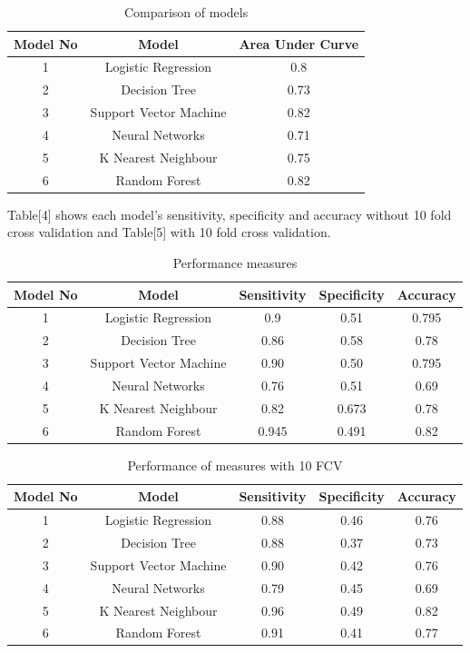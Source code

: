 \documentclass{article}\usepackage[]{graphicx}\usepackage[]{color}
\begin{document}
\begin{table}[t]
\caption{Comparison of models}
\centering
\begin{tabular}{c|c|c}
\toprule
Model No & Model & Area Under Curve \\
\midrule
1 & Logistic Regression & 0.8 \\
2 & Decision Tree & 0.73 \\
3 & Support Vector Machine & 0.82 \\
4 & Neural Networks & 0.71 \\
5 & K Nearest Neighbour & 0.75 \\
6 & Random Forest & 0.82 \\

\bottomrule
\end{tabular}
\label{tab}
\end{table}
Table[4] shows each model's sensitivity, specificity and accuracy without 10 fold cross validation and Table[5] with 10 fold cross validation.
\begin{table}[t]
\caption{Performance measures}
\centering
\begin{tabular}{c|c|c|c|c}
\toprule
Model No & Model & Sensitivity & Specificity & Accuracy \\
\midrule
1 & Logistic Regression & 0.9 & 0.51 & 0.795\\
2 & Decision Tree & 0.86 & 0.58 & 0.78\\
3 & Support Vector Machine & 0.90 & 0.50 & 0.795 \\
4 & Neural Networks & 0.76 & 0.51 & 0.69\\
5 & K Nearest Neighbour & 0.82 & 0.673 & 0.78\\
6 & Random Forest & 0.945 & 0.491 & 0.82\\
\bottomrule
\end{tabular}
\label{tab}
\end{table}

\begin{table}[t]
\caption{Performance of measures with 10 FCV}
\centering
\begin{tabular}{c|c|c|c|c}
\toprule
Model No & Model & Sensitivity & Specificity & Accuracy \\
\midrule
1 & Logistic Regression & 0.88 & 0.46 & 0.76\\
2 & Decision Tree & 0.88 & 0.37 & 0.73\\
3 & Support Vector Machine & 0.90 & 0.42 & 0.76 \\
4 & Neural Networks & 0.79 & 0.45 & 0.69\\
5 & K Nearest Neighbour & 0.96 & 0.49 & 0.82\\
6 & Random Forest & 0.91 & 0.41 & 0.77\\
\bottomrule
\end{tabular}
\label{tab}
\end{table}
\end{document}
